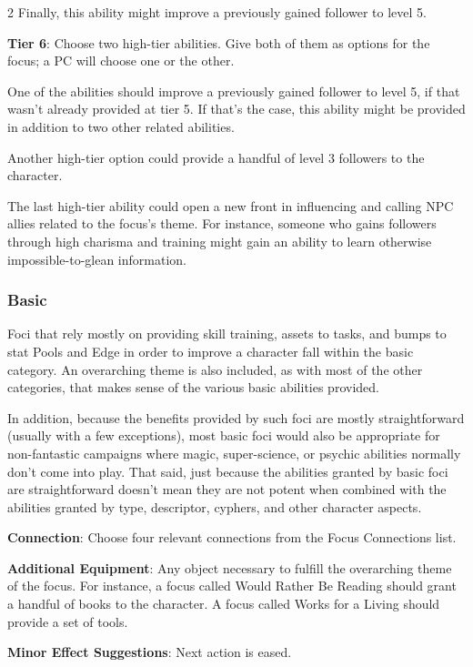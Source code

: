 \begin{multicols}{2}
Finally, this ability might improve a previously gained follower to level 5.

\textbf{Tier 6}: Choose two high-tier abilities. Give both of them as options for the focus; a PC will choose one or the other.

One of the abilities should improve a previously gained follower to level 5, if that wasn’t already provided at tier 5. If that’s the case, this ability might be provided in addition to two other related abilities.

Another high-tier option could provide a handful of level 3 followers to the character. 

The last high-tier ability could open a new front in influencing and calling NPC allies related to the focus’s theme. For instance, someone who gains followers through high charisma and training might gain an ability to learn otherwise impossible-to-glean information.

\subsubsection{Basic}

Foci that rely mostly on providing skill training, assets to tasks, and bumps to stat Pools and Edge in order to improve a character fall within the basic category. An overarching theme is also included, as with most of the other categories, that makes sense of the various basic abilities provided. 

In addition, because the benefits provided by such foci are mostly straightforward (usually with a few exceptions), most basic foci would also be appropriate for non-fantastic campaigns where magic, super-science, or psychic abilities normally don’t come into play. That said, just because the abilities granted by basic foci are straightforward doesn’t mean they are not potent when combined with the abilities granted by type, descriptor, cyphers, and other character aspects.

\textbf{Connection}: Choose four relevant connections from the Focus Connections list.

\textbf{Additional Equipment}: Any object necessary to fulfill the overarching theme of the focus. For instance, a focus called Would Rather Be Reading should grant a handful of books to the character. A focus called Works for a Living should provide a set of tools.

\textbf{Minor Effect Suggestions}: Next action is eased.


\end{multicols}

